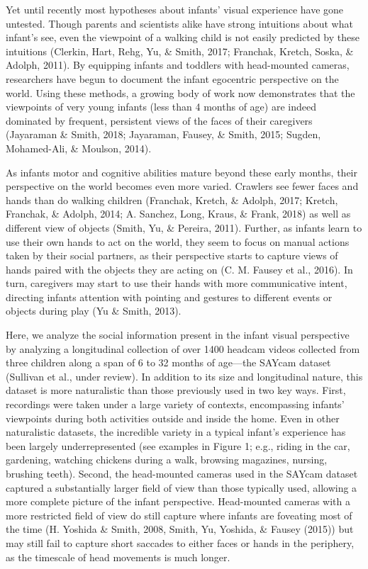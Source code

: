 \documentclass[10pt, letterpaper]{article}
\begin{document}
Yet until recently most hypotheses about infants' visual experience have
gone untested. Though parents and scientists alike have strong
intuitions about what infant's see, even the viewpoint of a walking
child is not easily predicted by these intuitions (Clerkin, Hart, Rehg,
Yu, \& Smith, 2017; Franchak, Kretch, Soska, \& Adolph, 2011). By
equipping infants and toddlers with head-mounted cameras, researchers
have begun to document the infant egocentric perspective on the world.
Using these methods, a growing body of work now demonstrates that the
viewpoints of very young infants (less than 4 months of age) are indeed
dominated by frequent, persistent views of the faces of their caregivers
(Jayaraman \& Smith, 2018; Jayaraman, Fausey, \& Smith, 2015; Sugden,
Mohamed-Ali, \& Moulson, 2014).

As infants motor and cognitive abilities mature beyond these early
months, their perspective on the world becomes even more varied.
Crawlers see fewer faces and hands than do walking children (Franchak,
Kretch, \& Adolph, 2017; Kretch, Franchak, \& Adolph, 2014; A. Sanchez,
Long, Kraus, \& Frank, 2018) as well as different view of objects
(Smith, Yu, \& Pereira, 2011). Further, as infants learn to use their
own hands to act on the world, they seem to focus on manual actions
taken by their social partners, as their perspective starts to capture
views of hands paired with the objects they are acting on (C. M. Fausey
et al., 2016). In turn, caregivers may start to use their hands with
more communicative intent, directing infants attention with pointing and
gestures to different events or objects during play (Yu \& Smith, 2013).

Here, we analyze the social information present in the infant visual
perspective by analyzing a longitudinal collection of over 1400 headcam
videos collected from three children along a span of 6 to 32 months of
age---the SAYcam dataset (Sullivan et al., under review). In addition to
its size and longitudinal nature, this dataset is more naturalistic than
those previously used in two key ways. First, recordings were taken
under a large variety of contexts, encompassing infants' viewpoints
during both activities outside and inside the home. Even in other
naturalistic datasets, the incredible variety in a typical infant's
experience has been largely underrepresented (see examples in Figure 1;
e.g., riding in the car, gardening, watching chickens during a walk,
browsing magazines, nursing, brushing teeth). Second, the head-mounted
cameras used in the SAYcam dataset captured a substantially larger field
of view than those typically used, allowing a more complete picture of
the infant perspective. Head-mounted cameras with a more restricted
field of view do still capture where infants are foveating most of the
time (H. Yoshida \& Smith, 2008, Smith, Yu, Yoshida, \& Fausey (2015))
but may still fail to capture short saccades to either faces or hands in
the periphery, as the timescale of head movements is much longer.
\end{document}
